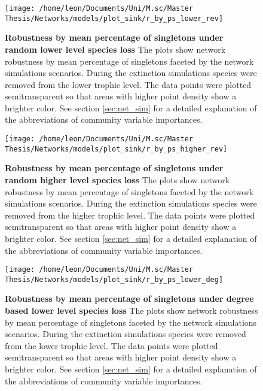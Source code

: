 \documentclass[12pt,a4paper]{article}
\begin{document}
\begin{figure}[H]
	 \centering
	 \texttt{[image: /home/leon/Documents/Uni/M.sc/Master Thesis/Networks/models/plot\_sink/r\_by\_ps\_lower\_rev]}
	 \captionsetup{width = .8\textwidth}
	 \caption[Robustness by mean percentage of singletons under random lower level species loss]{\textbf{Robustness by mean percentage of singletons under random lower level species loss} The plots show network robustness by mean percentage of singletons faceted by the network simulations scenarios. During the extinction simulations species were removed from the lower trophic level. The data points were plotted semitransparent so that areas with higher point density show a brighter color. See section \ref{sec:net_sim} for a detailed explanation of the abbreviations of community variable importances.}
	 \label{fig:r_by_ps_lower}
\end{figure}

\begin{figure}[H]
	 \centering
	 \texttt{[image: /home/leon/Documents/Uni/M.sc/Master Thesis/Networks/models/plot\_sink/r\_by\_ps\_higher\_rev]}
	 	 \captionsetup{width = .8\textwidth}
	 \caption[Robustness by mean percentage of singletons under random higher level species loss]{\textbf{Robustness by mean percentage of singletons under random higher level species loss} The plots show network robustness by mean percentage of singletons faceted by the network simulations scenarios. During the extinction simulations species were removed from the higher trophic level. The data points were plotted semitransparent so that areas with higher point density show a brighter color. See section \ref{sec:net_sim} for a detailed explanation of the abbreviations of community variable importances.}
	 \label{fig:r_by_ps_higher}
\end{figure}

\begin{figure}[H]
	 \centering
	 \texttt{[image: /home/leon/Documents/Uni/M.sc/Master Thesis/Networks/models/plot\_sink/r\_by\_ps\_lower\_deg]}
	 \captionsetup{width = .8\textwidth}
	 \caption[Robustness by mean percentage of singletons under degree based lower level species loss]{\textbf{Robustness by mean percentage of singletons under degree based lower level species loss} The plots show network robustness by mean percentage of singletons faceted by the network simulations scenarios. During the extinction simulations species were removed from the lower trophic level. The data points were plotted semitransparent so that areas with higher point density show a brighter color. See section \ref{sec:net_sim} for a detailed explanation of the abbreviations of community variable importances.}
	 \label{fig:r_by_ps_lower_deg}
\end{figure}
\end{document}
